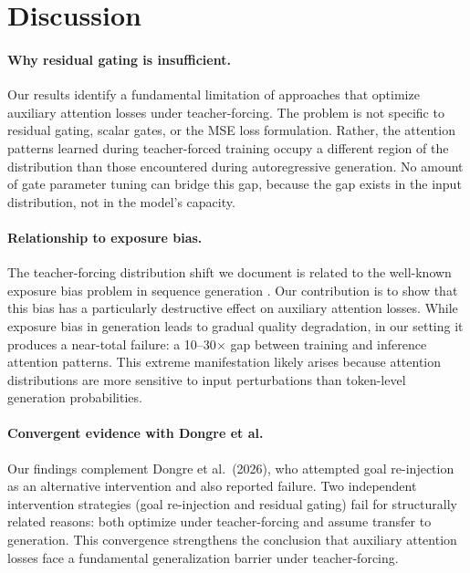 \documentclass[11pt,a4paper]{article}
\begin{document}
\section{Discussion}

\paragraph{Why residual gating is insufficient.}
Our results identify a fundamental limitation of approaches that optimize auxiliary attention losses under teacher-forcing.
The problem is not specific to residual gating, scalar gates, or the MSE loss formulation.
Rather, the attention patterns learned during teacher-forced training occupy a different region of the distribution than those encountered during autoregressive generation.
No amount of gate parameter tuning can bridge this gap, because the gap exists in the input distribution, not in the model's capacity.

\paragraph{Relationship to exposure bias.}
The teacher-forcing distribution shift we document is related to the well-known exposure bias problem in sequence generation \citep{ranzato2016}.
Our contribution is to show that this bias has a particularly destructive effect on auxiliary attention losses.
While exposure bias in generation leads to gradual quality degradation, in our setting it produces a near-total failure: a 10--30$\times$ gap between training and inference attention patterns.
This extreme manifestation likely arises because attention distributions are more sensitive to input perturbations than token-level generation probabilities.

\paragraph{Convergent evidence with Dongre et al.}
Our findings complement Dongre et al.\ (2026), who attempted goal re-injection as an alternative intervention and also reported failure.
Two independent intervention strategies (goal re-injection and residual gating) fail for structurally related reasons: both optimize under teacher-forcing and assume transfer to generation.
This convergence strengthens the conclusion that auxiliary attention losses face a fundamental generalization barrier under teacher-forcing.
\end{document}
